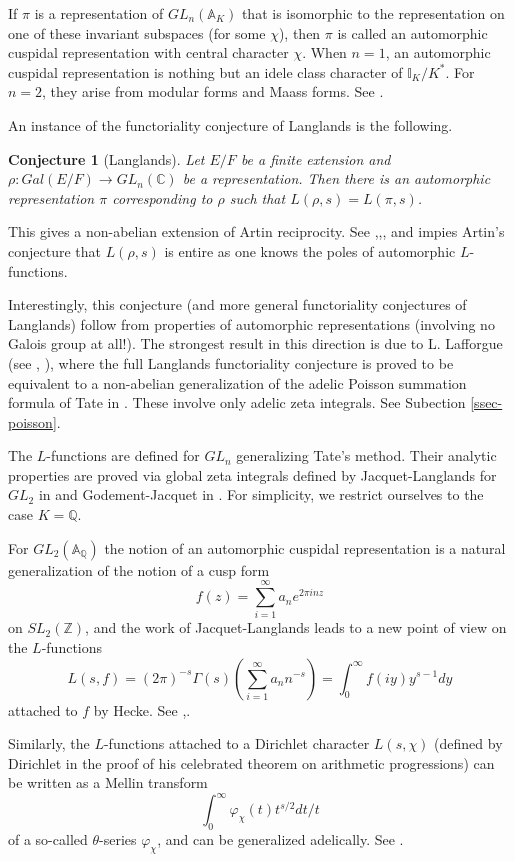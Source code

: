 \documentclass[12pt]{amsart}
\def\A{\mathbb{A}}
\def\I{\mathbb{I}}
\def\C{\mathbb{C}}
\def\Z{\mathbb{Z}}
\def\C{\mathbb{C}}
\def\Q{\mathbb{Q}}
\newtheorem{Conjecture}{Conjecture}[section]
\numberwithin{equation}{section}
\begin{document}
If $\pi$ is a representation of $GL_n(\A_K)$ that is isomorphic to the representation on one of these invariant subspaces (for some $\chi$), then $\pi$ is called an automorphic cuspidal representation with central character $\chi$.
When $n=1$, an automorphic cuspidal representation is nothing but an idele class character of $\I_K/K^*$. For $n=2$, they arise from modular forms and Maass forms. See \cite{bump}. 

An instance of the functoriality conjecture of Langlands is the following. 

\begin{Conjecture}[Langlands] Let $E/F$ be a finite extension and $\rho:Gal(E/F)\rightarrow GL_n(\C)$ be a representation. 
Then there is an automorphic representation $\pi$ corresponding to $\rho$ such that $L(\rho,s)=L(\pi,s)$.
\end{Conjecture}

This gives a non-abelian extension of Artin reciprocity. See \cite{lang-prob},\cite{bump},\cite{lang-icm}, and impies Artin's conjecture that $L(\rho,s)$ is entire as one knows the poles of automorphic $L$-functions.

Interestingly, this conjecture (and more general functoriality conjectures of Langlands) follow from properties of 
automorphic representations (involving no Galois group at all!). The strongest result in this direction is due to 
L. Lafforgue (see \cite{laff-nott}, \cite{laff-intro}), where the full Langlands functoriality conjecture is proved to be equivalent to a 
non-abelian generalization of the adelic Poisson summation formula of Tate in \cite{tate-thesis}. These involve only adelic zeta integrals. See Subection \ref{ssec-poisson}.

The $L$-functions are defined for $GL_n$ generalizing Tate's method. Their analytic properties are proved via global zeta integrals defined by Jacquet-Langlands for $GL_2$ in \cite{jac-lang} and Godement-Jacquet in \cite{jaq-good}. For simplicity, we restrict ourselves to the case $K=\Q$. 

For $GL_2(\A_{\Q})$ the notion of an automorphic cuspidal representation is a natural generalization of the notion of a cusp form 
$$f(z)=\sum_{i=1}^{\infty}a_ne^{2\pi inz}$$
on $SL_2(\Z)$, and the work of Jacquet-Langlands leads to a new point of view on the $L$-functions 
$$L(s,f)=(2\pi)^{-s}\Gamma(s)(\sum_{i=1}^{\infty} a_nn^{-s})=\int_{0}^{\infty}f(iy)y^{s-1}dy$$
attached to $f$ by Hecke. See \cite{bump},\cite{GS-book}.

Similarly, the $L$-functions attached to a Dirichlet character $L(s,\chi)$ (defined by Dirichlet in the proof of his celebrated theorem on arithmetic progressions) can be written as a Mellin transform 
$$\int_{0}^{\infty} \varphi_{\chi}(t)t^{s/2} dt/t$$
of a so-called $\theta$-series $\varphi_{\chi}$, and can be generalized adelically. See \cite{bump}.
\end{document}

